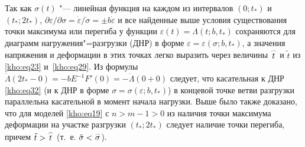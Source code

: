 Так как $\sigma(t)$ "--- линейная функция на каждом из интервалов $(0;t_\ast)$ и $(t_\ast;2t_\ast)$,  $\partial\varepsilon/\partial\sigma=\dot{\varepsilon}/\dot{\sigma}=\pm b\dot{\varepsilon}$ и все найденные выше условия существования точки максимума или перегиба у функции $\varepsilon(t)=\Lambda(t;b,t_\ast)$ сохраняются для диаграмм нагружения"=разгрузки (ДНР) в форме $\varepsilon=\varepsilon(\sigma;b,t_\ast)$, а значения напряжения и деформации в этих точках легко выразить через величины $\mathord{\buildrel{\lower3pt\hbox{$\scriptscriptstyle\frown$}}\over{t}}$ и $\tilde{t}$ из \eqref{kho:eq23} и~\eqref{kho:eq29}. Из формулы $\dot{\Lambda}(2t_\ast-0)=-bE^{-1}F'(0)=-\dot{\Lambda}(0+0)$ следует, что касательная к ДНР \eqref{kho:eq32} (и к ДНР в форме $\sigma=\sigma(\varepsilon;b,t_\ast)$) в концевой точке ветви разгрузки параллельна касательной в момент начала нагрузки. Выше было также доказано, что для моделей \eqref{kho:eq19} с $n>m-1>0$ из наличия точки максимума деформации на участке разгрузки $(t_\ast;2t_\ast)$ следует наличие точки перегиба, причем $\tilde{t}>\mathord{\buildrel{\lower3pt\hbox{$\scriptscriptstyle\frown$}}\over{t}}$ (т.~е. $\tilde{\sigma}<\mathord{\buildrel{\lower3pt\hbox{$\scriptscriptstyle\frown$}}\over{\sigma}}$).





